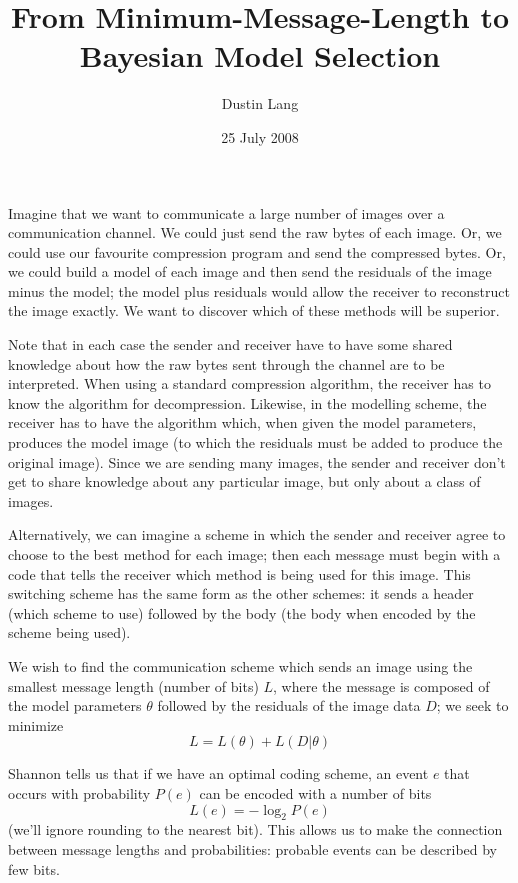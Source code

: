 \documentclass[letterpaper]{article}
\title{From Minimum-Message-Length to Bayesian Model Selection}
\author{Dustin Lang}
\date{25 July 2008}
\begin{document}
\maketitle

Imagine that we want to communicate a large number of images over a
communication channel.  We could just send the raw bytes of each image.
Or, we could use our favourite compression program and send the
compressed bytes.  Or, we could build a model of each image and then send
the residuals of the image minus the model; the model plus residuals would
allow the receiver to reconstruct the image exactly.  We want to discover which
of these methods will be superior.

Note that in each case the sender and receiver have to have some shared knowledge
about how the raw bytes sent through the channel are to be interpreted.  When using
a standard compression algorithm, the receiver has to know the algorithm for
decompression.  Likewise, in the modelling scheme, the receiver has to have the
algorithm which, when given the model parameters, produces the model image (to which
the residuals must be added to produce the original image).  Since we are sending
many images, the sender and receiver don't get to share knowledge about any
particular image, but only about a class of images.

Alternatively, we can imagine a scheme in which the sender and receiver agree
to choose to the best method for each image; then each message must begin with
a code that tells the receiver which method is being used for this image.  This
switching scheme has the same form as the other schemes: it sends a header
(which scheme to use) followed by the body (the body when encoded by the scheme
being used).

We wish to find the communication scheme which sends an image using the smallest
message length (number of bits) $L$, where the message is composed of the model
parameters $\theta$ followed by the residuals of the image data $D$;
we seek to minimize
\[ L = L(\theta) + L(D | \theta) \]

Shannon tells us that if we have an optimal coding scheme, an event $e$ that
occurs with probability $P(e)$ can be encoded with a number of bits
\[ L(e) = -\log_2 P(e) \]
(we'll ignore rounding to the nearest bit).
This allows us to make the connection between message lengths and probabilities:
probable events can be described by few bits.
\end{document}
